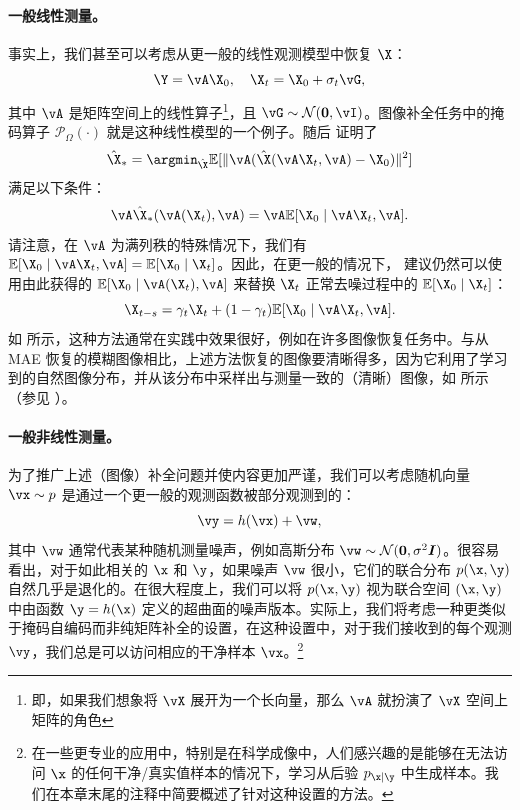 \documentclass[../../book-main_zh.tex]{subfiles}
\begin{document}
\paragraph{一般线性测量。}
事实上，我们甚至可以考虑从更一般的线性观测模型中恢复 $\X$：
\begin{equation}
    \Y = \vA\X_0,  \quad \X_t = \X_0 + \sigma_t \vG,
\end{equation}
其中 $\vA$ 是矩阵空间上的线性算子\footnote{即，如果我们想象将 \(\vX\) 展开为一个长向量，那么 \(\vA\) 就扮演了 \(\vX\) 空间上矩阵的角色}，且 $\vG \sim \mathcal{N}(\boldsymbol{0}, \vI)$。图像补全任务中的掩码算子 $\mathcal{P}_{\Omega}(\cdot)$ 就是这种线性模型的一个例子。随后 \cite{daras2023ambient} 证明了
\begin{equation}
    \hat{\X}_* = \argmin_{\hat{\X}}
    \mathbb{E}[\|\vA(\hat{\X}(\vA\X_t, \vA) - \X_0)\|^2]
\end{equation}
满足以下条件：
\begin{equation}
    \vA \hat{\X}_*(\vA(\X_t), \vA) = \vA \mathbb{E}[\X_0 \mid \vA \X_t, \vA].
\end{equation} 请注意，在 $\vA$ 为满列秩的特殊情况下，我们有 $ \mathbb{E}[\X_0 \mid \vA\X_t, \vA] = \mathbb{E}[\X_0 \mid \X_t]$。因此，在更一般的情况下，\cite{daras2023ambient} 建议仍然可以使用由此获得的 $\mathbb{E}[\X_0 \mid \vA(\X_t), \vA]$ 来替换 $\X_t$ 正常去噪过程中的 $\mathbb{E}[\X_0 \mid \X_t]$：
\begin{equation}
    \X_{t-s} = \gamma_t \X_t + (1-\gamma_t) \mathbb{E}[\X_0 \mid \vA\X_t, \vA].
\end{equation}
如 \cite{daras2023ambient} 所示，这种方法通常在实践中效果很好，例如在许多图像恢复任务中。与从 MAE 恢复的模糊图像相比，上述方法恢复的图像要清晰得多，因为它利用了学习到的自然图像分布，并从该分布中采样出与测量一致的（清晰）图像，如  所示（参见 ）。

\paragraph{一般非线性测量。}
为了推广上述（图像）补全问题并使内容更加严谨，我们可以考虑随机向量 $\vx \sim p$ 是通过一个更一般的观测函数被部分观测到的：
\begin{equation}\label{eq:measurement-matching-observation}
    \vy = h(\vx) + \vw,
\end{equation}
其中 $\vw$ 通常代表某种随机测量噪声，例如高斯分布 $\vw \sim \mathcal{N}(\mathbf{0}, \sigma^2 \boldsymbol{I})$。很容易看出，对于如此相关的 $\x$ 和 $\y$，如果噪声 $\vw$ 很小，它们的联合分布 $p(\x, \y)$ 自然几乎是退化的。在很大程度上，我们可以将 $p(\x, \y)$ 视为联合空间 $(\x, \y)$ 中由函数 $\y = h(\x)$ 定义的超曲面的噪声版本。实际上，我们将考虑一种更类似于掩码自编码而非纯矩阵补全的设置，在这种设置中，对于我们接收到的每个观测 $\vy$，我们总是可以访问相应的干净样本 $\vx$。\footnote{在一些更专业的应用中，特别是在科学成像中，人们感兴趣的是能够在无法访问 $\x$ 的任何干净/真实值样本的情况下，学习从后验 $p_{\x \mid \y}$ 中生成样本。我们在本章末尾的注释中简要概述了针对这种设置的方法。}
\end{document}
